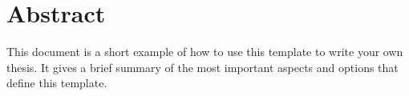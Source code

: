 \newpage
\section*{Abstract}
%

This document is a short example of how to use this template to write your own thesis. It gives a brief summary of the most important aspects and options that define this template.
